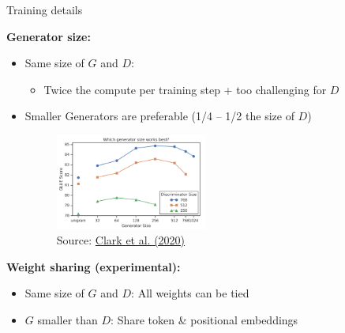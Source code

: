 \begin{frame}{Training details}

\vfill

	\textbf{Generator size:}

	\begin{itemize}
		\item Same size of $G$ and $D$: 
			\begin{itemize}
				\item Twice the compute per training step + too challenging for $D$
			\end{itemize}
		\item Smaller Generators are preferable (1/4 -- 1/2 the size of $D$)
	\begin{figure}
		\centering
		\includegraphics[width = 5cm]{figure/electra-size-g.png}\\ 
		\scriptsize{Source:} \href{https://arxiv.org/pdf/2003.10555.pdf}{\scriptsize Clark et al. (2020)}
	\end{figure}
	\end{itemize}
	
	\textbf{Weight sharing (experimental):}

	\begin{itemize}
		\item Same size of $G$ and $D$: All weights can be tied
		\item $G$ smaller than $D$: Share token \& positional embeddings 
	\end{itemize}
	
\vfill

\end{frame}


